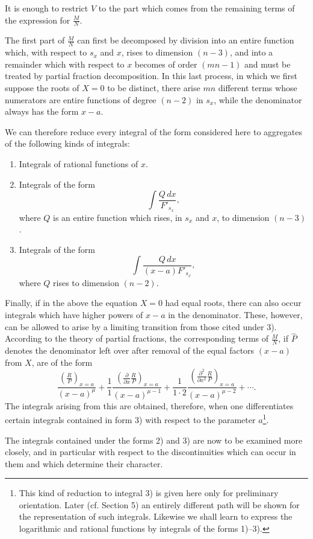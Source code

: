 \documentclass[10pt]{article}
\begin{document}
It is enough to restrict $V$ to the part which comes from the remaining terms of the expression for $\frac{M}{N}$.

The first part of $\frac{M}{N}$ can first be decomposed by division into an entire function which, with respect to $s_x$ and $x$, rises to dimension $(n-3)$, and into a remainder which with respect to $x$ becomes of order $(mn-1)$ and must be treated by partial fraction decomposition. In this last process, in which we first suppose the roots of $X=0$ to be distinct, there arise $mn$ different terms whose numerators are entire functions of degree $(n-2)$ in $s_x$, while the denominator always has the form $x-a$.

We can therefore reduce every integral of the form considered here to aggregates of the following kinds of integrals:
\begin{enumerate}
\item Integrals of rational functions of $x$.
\item Integrals of the form
\[
\int\frac{Q\,dx}{F'_{s_x}},
\]
where $Q$ is an entire function which rises, in $s_x$ and $x$, to dimension $(n-3)$.
\item Integrals of the form
\[
\int\frac{Q\,dx}{(x-a)F'_{s_x}},
\]
where $Q$ rises to dimension $(n-2)$.
\end{enumerate}
Finally, if in the above the equation $X=0$ had equal roots, there can also occur integrals which have higher powers of $x-a$ in the denominator. These, however, can be allowed to arise by a limiting transition from those cited under 3). According to the theory of partial fractions, the corresponding terms of $\frac{M}{N}$, if $\hat P$ denotes the denominator left over after removal of the equal factors $(x-a)$ from $X$, are of the form
\[
\frac{\left(\frac{R}{P}\right)_{x=a}}{(x-a)^\mu}
+\frac{1}{1}\frac{\left(\frac{\partial}{\partial x}\frac{R}{P}\right)_{x=a}}{(x-a)^{\mu-1}}
+\frac{1}{1\cdot2}\frac{\left(\frac{\partial^2}{\partial x^2}\frac{R}{P}\right)_{x=a}}{(x-a)^{\mu-2}}+\cdots.
\]
The integrals arising from this are obtained, therefore, when one differentiates certain integrals contained in form 3) with respect to the parameter $a$\footnote{This kind of reduction to integral 3) is given here only for preliminary orientation. Later (cf. Section 5) an entirely different path will be shown for the representation of such integrals. Likewise we shall learn to express the logarithmic and rational functions by integrals of the forms 1)--3).}.

The integrals contained under the forms 2) and 3) are now to be examined more closely, and in particular with respect to the discontinuities which can occur in them and which determine their character.
\end{document}
